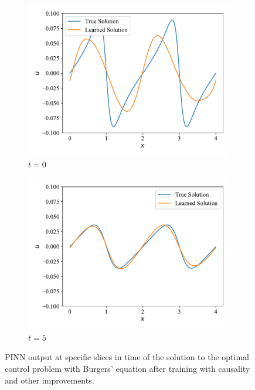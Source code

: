 \begin{figure}[H]
     \centering
     \begin{subfigure}[b]{0.45\textwidth}
         \centering
         \includegraphics[width=1.0\linewidth]{Figures/AdvancedExperiments/InitialControlCausal/attempt3/burger_slice0.pdf}
         \caption{$t = 0$}
         \label{fig:burger_control_initial_slice0_attempt3}
     \end{subfigure}
     \hfill
     \begin{subfigure}[b]{0.45\textwidth}
         \centering
         \includegraphics[width=1.0\linewidth]{Figures/AdvancedExperiments/InitialControlCausal/attempt3/burger_slice1.pdf}
         \caption{$t = 5$}
         \label{fig:burger_control_initial_slice1_attempt3}
     \end{subfigure}
    \caption{PINN output at specific slices in time of the solution to the optimal control problem with Burgers' equation after training with causality and other improvements.}
    \label{fig:burger_control_initial_slices_attempt3}
\end{figure}

